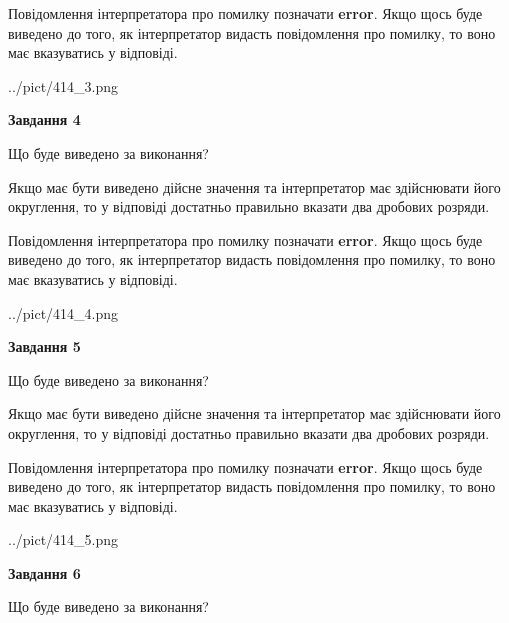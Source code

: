 \documentclass[12pt, ukrainian]{article}
\begin{document}
{\begin {Large}
Повідомлення інтерпретатора про помилку позначати \textbf{error}.
Якщо щось буде виведено до того, як інтерпретатор видасть повідомлення про помилку, 
то воно має вказуватись у відповіді. \par

\begin{center}
	{../pict/414_3.png}
\end{center}
\newpage

{\begin {center}\textbf{Завдання 4}\end {center}}\par
Що буде виведено за виконання? \par

Якщо має бути виведено дійсне значення та інтерпретатор має здійснювати його округлення, 
то у відповіді достатньо правильно вказати два дробових розряди.

Повідомлення інтерпретатора про помилку позначати \textbf{error}.
Якщо щось буде виведено до того, як інтерпретатор видасть повідомлення про помилку, 
то воно має вказуватись у відповіді. \par

\begin{center}
	{../pict/414_4.png}
\end{center}
\newpage

{\begin {center}\textbf{Завдання 5}\end {center}}\par
Що буде виведено за виконання? \par

Якщо має бути виведено дійсне значення та інтерпретатор має здійснювати його округлення, 
то у відповіді достатньо правильно вказати два дробових розряди.

Повідомлення інтерпретатора про помилку позначати \textbf{error}.
Якщо щось буде виведено до того, як інтерпретатор видасть повідомлення про помилку, 
то воно має вказуватись у відповіді. \par

\begin{center}
	{../pict/414_5.png}
\end{center}
\newpage

{\begin {center}\textbf{Завдання 6}\end {center}}\par
Що буде виведено за виконання? \par


\end{Large}}
\end{document}
